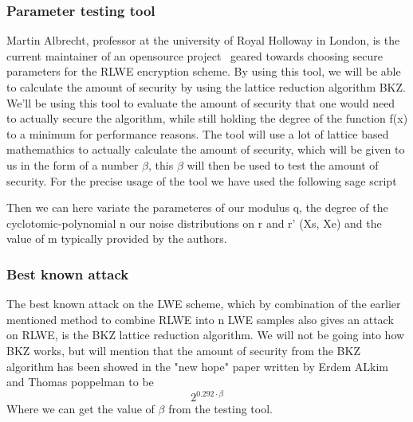 \documentclass[../main.tex]{subfiles}
\begin{document}
    \subsubsection{Parameter testing tool}
        Martin Albrecht, professor at the university of Royal Holloway in London, is the current maintainer of an
		opensource project~\cite{estimations-tool} geared towards choosing secure parameters for the RLWE encryption scheme.
		By using this tool, we will be able to calculate the amount of security by using the lattice reduction algorithm BKZ.
		We'll be using this tool to evaluate the amount of security that one would need to actually secure the algorithm,
		while still holding the degree of the function f(x) to a minimum for performance reasons.
		The tool will use a lot of lattice based mathemathics to actually calculate the amount of security, which will be given
		to us in the form of a number $\beta$, this $\beta$ will then be used to test the amount of security.
        For the precise usage of the tool we have used the following sage script
        
        Then we can here variate the parameteres of our modulus q, the degree of the cyclotomic-polynomial n
        our noise distributions on r and r' (Xs, Xe) and the value of m typically provided by the authors.

    \subsubsection{Best known attack}
		The best known attack on the LWE scheme, which by combination of the earlier mentioned method to combine RLWE
		into n LWE samples also gives an attack on RLWE, is the BKZ lattice reduction algorithm.
		We will not be going into how BKZ works, but will mention that the amount of security from the BKZ algorithm
		has been showed in the "new hope" paper \cite{usenix16} written by Erdem ALkim and Thomas poppelman to be
		\[ 2^{0.292 \cdot \beta} \]
		Where we can get the value of $\beta$ from the testing tool.
\end{document}
